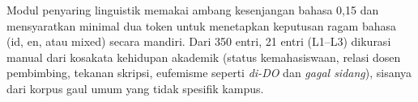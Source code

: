 Modul penyaring linguistik memakai ambang kesenjangan bahasa 0,15 dan mensyaratkan minimal dua token untuk menetapkan keputusan ragam bahasa (id, en, atau mixed) secara mandiri. Dari 350 entri, 21 entri (L1--L3) dikurasi manual dari kosakata kehidupan akademik (status kemahasiswaan, relasi dosen pembimbing, tekanan skripsi, eufemisme seperti \textit{di-DO} dan \textit{gagal sidang}), sisanya dari korpus gaul umum yang tidak spesifik kampus.



